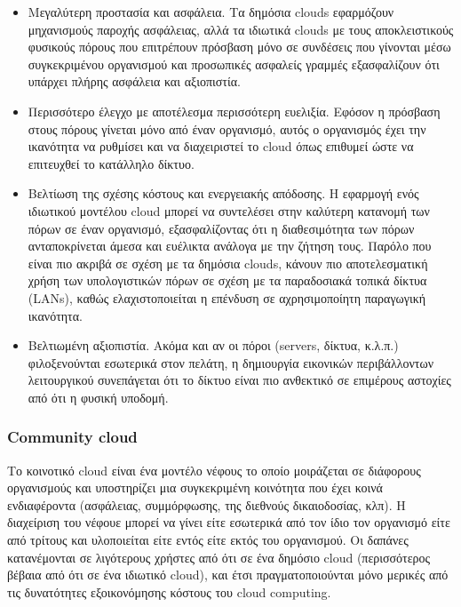 	\begin{itemize}
	
	\item Μεγαλύτερη προστασία και ασφάλεια. Τα δημόσια clouds εφαρμόζουν μηχανισμούς παροχής ασφάλειας, αλλά τα ιδιωτικά clouds με τους αποκλειστικούς φυσικούς πόρους που επιτρέπουν πρόσβαση μόνο σε συνδέσεις που γίνονται μέσω συγκεκριμένου οργανισμού και προσωπικές ασφαλείς γραμμές εξασφαλίζουν ότι υπάρχει πλήρης ασφάλεια και αξιοπιστία.
	
	\item Περισσότερο έλεγχο με αποτέλεσμα περισσότερη ευελιξία. Εφόσον η πρόσβαση στους πόρους γίνεται μόνο από έναν οργανισμό, αυτός ο οργανισμός έχει την ικανότητα να ρυθμίσει και να διαχειριστεί το cloud όπως επιθυμεί ώστε να επιτευχθεί το κατάλληλο δίκτυο. 
	
	\item Βελτίωση  της σχέσης κόστους και ενεργειακής απόδοσης. Η εφαρμογή ενός ιδιωτικού μοντέλου cloud μπορεί να συντελέσει στην καλύτερη κατανομή των πόρων σε έναν οργανισμό, εξασφαλίζοντας ότι η διαθεσιμότητα των πόρων ανταποκρίνεται άμεσα και ευέλικτα ανάλογα με την ζήτηση τους. Παρόλο που είναι πιο ακριβά σε σχέση με τα δημόσια clouds, κάνουν πιο αποτελεσματική χρήση των υπολογιστικών πόρων σε σχέση με τα παραδοσιακά τοπικά δίκτυα (LANs), καθώς ελαχιστοποιείται η επένδυση σε αχρησιμοποίητη παραγωγική ικανότητα. 
	
	\item Βελτιωμένη αξιοπιστία. Ακόμα και αν οι πόροι (servers, δίκτυα, κ.λ.π.) φιλοξενούνται εσωτερικά στον πελάτη, η δημιουργία εικονικών περιβάλλοντων λειτουργικού συνεπάγεται ότι το δίκτυο είναι πιο ανθεκτικό σε επιμέρους αστοχίες από ότι η φυσική υποδομή. 

	\end{itemize}
	
		
		\subsubsection{Community cloud}
		
		Το κοινοτικό cloud είναι ένα μοντέλο νέφους το οποίο μοιράζεται σε διάφορους οργανισμούς και υποστηρίζει μια συγκεκριμένη κοινότητα που έχει κοινά ενδιαφέροντα (ασφάλειας,  συμμόρφωσης, της διεθνούς δικαιοδοσίας, κλπ). Η διαχείριση του νέφουε μπορεί να γίνει είτε εσωτερικά  από τον ίδιο τον οργανισμό είτε από τρίτους και υλοποιείται είτε εντός είτε εκτός του οργανισμού. Οι δαπάνες κατανέμονται σε λιγότερους χρήστες από ότι σε ένα δημόσιο cloud (περισσότερος βέβαια από ότι σε ένα ιδιωτικό cloud), και έτσι πραγματοποιούνται μόνο μερικές από τις δυνατότητες εξοικονόμησης κόστους του cloud computing.	\cite{Briscoe2009} \cite{condori}
	
